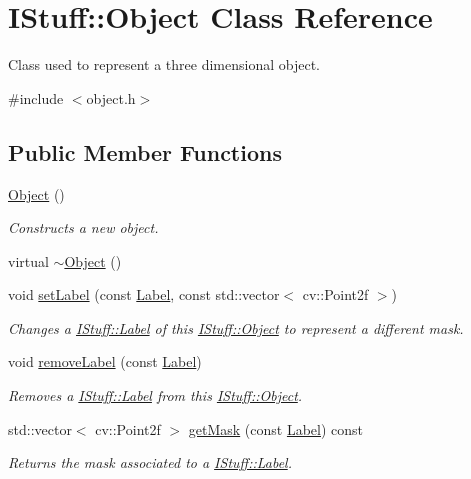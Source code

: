 \hypertarget{class_i_stuff_1_1_object}{\section{I\-Stuff\-:\-:Object Class Reference}
\label{class_i_stuff_1_1_object}
}


Class used to represent a three dimensional object.  




{\ttfamily \#include $<$object.\-h$>$}

\subsection*{Public Member Functions}
\begin{DoxyCompactItemize}
\item 
\hyperlink{class_i_stuff_1_1_object_a40860402e64d8008fb42329df7097cdb}{Object} ()
\begin{DoxyCompactList}\small\item\em Constructs a new object. \end{DoxyCompactList}\item 
virtual \hyperlink{class_i_stuff_1_1_object_ae8f5483f459e46687bd01e6f9977afd3}{$\sim$\-Object} ()
\item 
void \hyperlink{class_i_stuff_1_1_object_aee004eb2e471cda24ad4a58f6ae55b41}{set\-Label} (const \hyperlink{namespace_i_stuff_a88882361612ef78eee4224382c8d126b}{Label}, const std\-::vector$<$ cv\-::\-Point2f $>$)
\begin{DoxyCompactList}\small\item\em Changes a \hyperlink{namespace_i_stuff_a88882361612ef78eee4224382c8d126b}{I\-Stuff\-::\-Label} of this \hyperlink{class_i_stuff_1_1_object}{I\-Stuff\-::\-Object} to represent a different mask. \end{DoxyCompactList}\item 
void \hyperlink{class_i_stuff_1_1_object_ab9f6cf27353153dd8c9d3e55c7321f7f}{remove\-Label} (const \hyperlink{namespace_i_stuff_a88882361612ef78eee4224382c8d126b}{Label})
\begin{DoxyCompactList}\small\item\em Removes a \hyperlink{namespace_i_stuff_a88882361612ef78eee4224382c8d126b}{I\-Stuff\-::\-Label} from this \hyperlink{class_i_stuff_1_1_object}{I\-Stuff\-::\-Object}. \end{DoxyCompactList}\item 
std\-::vector$<$ cv\-::\-Point2f $>$ \hyperlink{class_i_stuff_1_1_object_a469d14582bee7d25f546742d75f7eae4}{get\-Mask} (const \hyperlink{namespace_i_stuff_a88882361612ef78eee4224382c8d126b}{Label}) const 
\begin{DoxyCompactList}\small\item\em Returns the mask associated to a \hyperlink{namespace_i_stuff_a88882361612ef78eee4224382c8d126b}{I\-Stuff\-::\-Label}. \end{DoxyCompactList}\end{DoxyCompactItemize}
